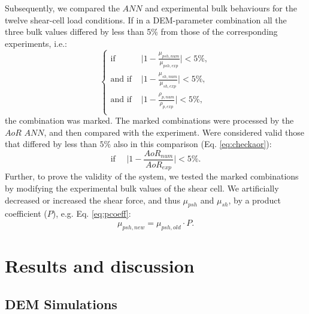 \documentclass{llncs}
\begin{document}
Subsequently, we compared the $ANN$ and experimental bulk behaviours for the
twelve shear-cell load conditions.
If in a DEM-parameter combination all the three bulk values differed by less 
than 5\% from those of the corresponding experiments, i.e.:
\begin{equation}
 \begin{cases}
\text{if } & \lvert{1-\frac{\mu_{psh,num}}{\mu_{psh,exp}}}\rvert < 5\%  ,\\
\text{and if } & \lvert{1-\frac{\mu_{sh,num}}{\mu_{sh,exp}}}\rvert < 5\% , \\ 
\text{and if } & \lvert{1-\frac{\rho_{p,num}}{\rho_{p,exp}}}\rvert < 5\% ,\\ 
\end{cases}
 \label{eq:check2}
\end{equation}
the combination was marked. The marked combinations were processed by the
$AoR$ $ANN$, and then compared with the experiment.
Were considered valid those that differed by less than $5\%$ also in this
comparison (Eq. \ref{eq:checkaor}):
\begin{equation}
\text{if} ~~~~~~ \lvert{1-\frac{AoR_{num}}{AoR_{exp}}}\rvert < 5\% .
\label{eq:checkaor}
\end{equation}
Further, to prove the validity of the system, we tested the marked combinations
by modifying the experimental bulk values of the shear cell. 
We artificially decreased or increased the shear force, and thus $\mu_{psh}$ and
$\mu_{sh}$, by a product coefficient ($P$), e.g. Eq. \ref{eq:pcoeff}:
\begin{equation}
\label{eq:pcoeff}
\mu_{psh, new} = \mu_{psh, old} \cdot P .
\end{equation}

\section{Results and discussion}
\label{sec:results}

\subsection{DEM Simulations}
\label{subsec:simulations}
\end{document}
